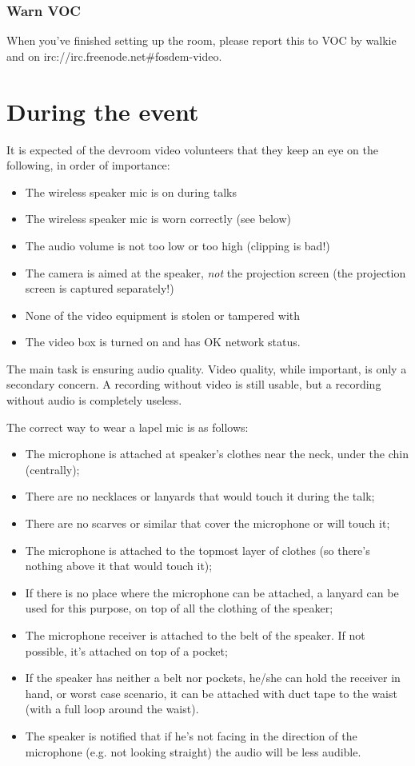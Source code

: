 \documentclass{article}
\begin{document}
\subsubsection{Warn VOC}
When you've finished setting up the room, please report this to VOC by walkie and on irc://irc.freenode.net\#fosdem-video.

\section{During the event}
It is expected of the devroom video volunteers that they keep an eye on the following, in order of importance:
\begin{itemize}
  \item The wireless speaker mic is on during talks
  \item The wireless speaker mic is worn correctly (see below)
  \item The audio volume is not too low or too high (clipping is bad!)
  \item The camera is aimed at the speaker, \emph{not} the projection screen (the projection screen is captured separately!)
  \item None of the video equipment is stolen or tampered with
  \item The video box is turned on and has OK network status.
\end{itemize}
The main task is ensuring audio quality. Video quality, while important, is only a secondary concern. A recording without video is still usable, but a recording without audio is completely useless.

The correct way to wear a lapel mic is as follows:
\begin{itemize}
  \item The microphone is attached at speaker's clothes near the neck, under the chin (centrally);
  \item There are no necklaces or lanyards that would touch it during the talk;
  \item There are no scarves or similar that cover the microphone or will touch it;
  \item The microphone is attached to the topmost layer of clothes (so there's nothing above it that would touch it);
  \item If there is no place where the microphone can be attached, a lanyard can be used for this purpose, on top of all the clothing of the speaker;
  \item The microphone receiver is attached to the belt of the speaker. If not possible, it's attached on top of a pocket;
  \item If the speaker has neither a belt nor pockets, he/she can hold the receiver in hand, or worst case scenario, it can be attached with duct tape to the waist (with a full loop around the waist).
  \item The speaker is notified that if he's not facing in the direction of the microphone (e.g. not looking straight) the audio will be less audible.
\end{itemize}
\end{document}
